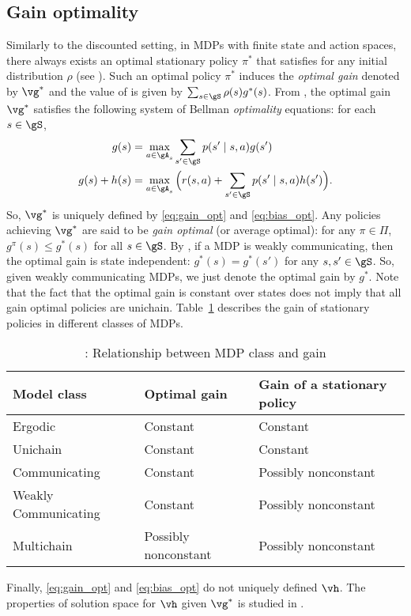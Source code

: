 \subsection{Gain optimality}
\label{ch:mdp:sec:gain}

Similarly to the discounted setting, in MDPs with finite state and action spaces, there always exists an optimal stationary policy $\pi^*$ that satisfies  for any initial distribution $\rho$ (see \cite[Theorem~9.1.8]{puterman2014markov}).
Such an optimal policy $\pi^*$ induces the \emph{optimal gain} denoted by $\vg^*$ and the value of  is given by $\sum_{s\in\gS} \rho(s)g^*(s)$.
From \cite[Chapter~9]{puterman2014markov}, the optimal gain $\vg^*$ satisfies the following system of Bellman \emph{optimality} equations: for each $s\in\gS$,
\begin{align}
    g(s) &= \max_{a\in\gA_s} \sum_{s'\in\gS}p(s'\mid s,a)g(s') \label{eq:gain_opt} \\
    g(s) +h(s) &= \max_{a\in\gA_s}\Big(r(s,a) +\sum_{s'\in\gS}p(s'\mid s,a)h(s')\Big) \label{eq:bias_opt}.
\end{align}
So, $\vg^*$ is uniquely defined by \eqref{eq:gain_opt} and \eqref{eq:bias_opt}.
Any policies achieving $\vg^*$ are said to be \emph{gain optimal} (or average optimal): for any $\pi\in\Pi$, $g^\pi(s)\le g^*(s)$ for all $s\in\gS$.
By \cite[Theorem~8.3.2]{puterman2014markov}, if a MDP is weakly communicating, then the optimal gain is state independent: $g^*(s)=g^*(s')$ for any $s,s'\in\gS$.
So, given weakly communicating MDPs, we just denote the optimal gain by $g^*$.
Note that the fact that the optimal gain is constant over states does not imply that all gain optimal policies are unichain.
Table~\ref{tab:mdp_vs_gain} describes the gain of stationary policies in different classes of MDPs.
\begin{table}[ht]
    \begin{tabular}{lll}
        \hline
        Model class          & Optimal gain         & Gain of a stationary policy \\ \hline
        Ergodic              & Constant             & Constant                    \\
        Unichain             & Constant             & Constant                    \\
        Communicating        & Constant             & Possibly nonconstant        \\
        Weakly Communicating & Constant             & Possibly nonconstant        \\
        Multichain           & Possibly nonconstant & Possibly nonconstant       \\ \hline
    \end{tabular}
    \caption{\cite[Table~8.3.1]{puterman2014markov}: Relationship between MDP class and gain}
    \label{tab:mdp_vs_gain}
\end{table}
Finally, \eqref{eq:gain_opt} and \eqref{eq:bias_opt} do not uniquely defined $\vh$.
The properties of solution space for $\vh$ given $\vg^*$ is studied in \cite{schweitzer1978functional}.

